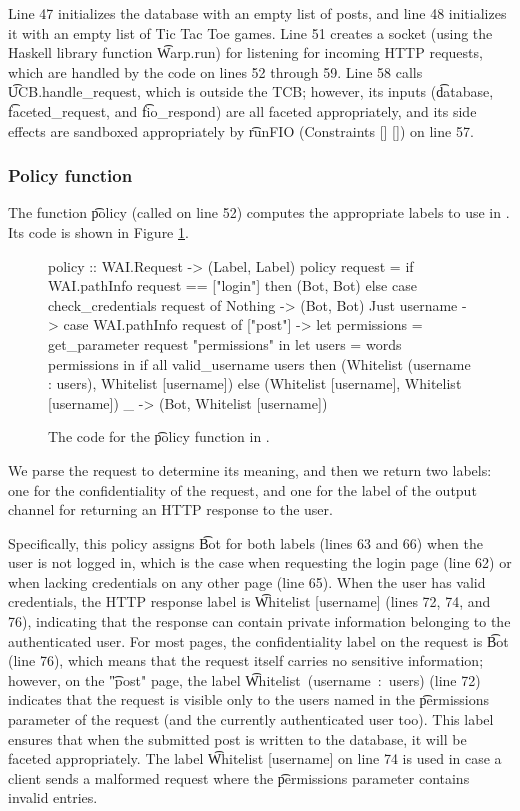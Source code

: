 \begin{refsection}
Line 47 initializes the database with an empty list of posts,
and line 48 initializes it with an empty list of Tic Tac Toe games.
%
Line 51 creates a socket (using the Haskell library function \t{Warp.run}) for listening for incoming HTTP requests,
which are handled by the code on lines 52 through 59.
%
Line 58 calls \t{UCB.handle\_request}, which is outside the TCB;
however, its inputs (\t{database}, \t{faceted\_request}, and \t{fio\_respond}) are all faceted appropriately,
and its side effects are sandboxed appropriately by \t{runFIO (Constraints [] [])} on line 57.

\subsubsection{Policy function}

The function \t{policy} (called on line 52) computes the appropriate labels to use in \myapp{}.
%
Its code is shown in Figure \ref{code_policy}.
\begin{figure}
\begin{fb}
policy :: WAI.Request -> (Label, Label)
policy request =
  if WAI.pathInfo request == ["login"] then
    (Bot, Bot)
  else case check_credentials request of
    Nothing ->
      (Bot, Bot)
    Just username -> case WAI.pathInfo request of
      ["post"] ->
        let permissions = get_parameter request "permissions"  in
        let users = words permissions  in
        if all valid_username users then
          (Whitelist (username : users), Whitelist [username])
        else
          (Whitelist [username], Whitelist [username])
      _ ->
        (Bot, Whitelist [username])
\end{fb}
\caption{The code for the \t{policy} function in \viF{}.}
\label{code_policy}
\end{figure}
We parse the request to determine its meaning,
and then we return two labels:
one for the confidentiality of the request,
and one for the label of the output channel for returning an HTTP response to the user.

Specifically, this policy assigns \t{Bot} for both labels (lines 63 and 66) when the user is not logged in,
which is the case when requesting the login page (line 62)
or when lacking credentials on any other page (line 65).
%
When the user has valid credentials,
the HTTP response label is \t{Whitelist [username]} (lines 72, 74, and 76),
indicating that the response can contain private information belonging to the authenticated user.
%
For most pages,
the confidentiality label on the request is \t{Bot} (line 76),
which means that the request itself carries no sensitive information;
however, on the \t{"post"} page,
the label \t{Whitelist~(username~:~users)} (line 72) indicates that the request is visible only to
the users named in the \t{permissions} parameter of the request
(and the currently authenticated user too).
%
This label ensures that when the submitted post is written to the database,
it will be faceted appropriately.
%
The label \t{Whitelist [username]} on line 74 is used in case a client sends a malformed request
where the \t{permissions} parameter contains invalid entries.


\end{refsection}
